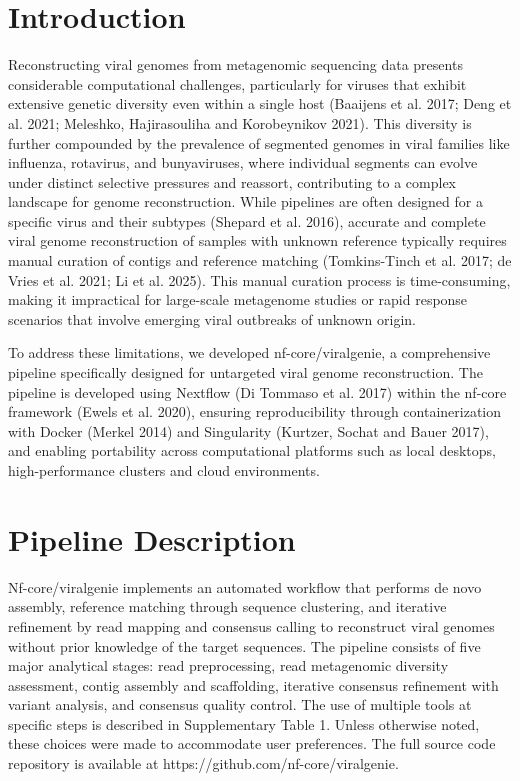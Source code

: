 
\section{Introduction}

Reconstructing viral genomes from metagenomic sequencing data presents considerable computational challenges, particularly for viruses that exhibit extensive genetic diversity even within a single host (Baaijens et al. 2017; Deng et al. 2021; Meleshko, Hajirasouliha and Korobeynikov 2021). This diversity is further compounded by the prevalence of segmented genomes in viral families like influenza, rotavirus, and bunyaviruses, where individual segments can evolve under distinct selective pressures and reassort, contributing to a complex landscape for genome reconstruction. While pipelines are often designed for a specific virus and their subtypes (Shepard et al. 2016), accurate and complete viral genome reconstruction of samples with unknown reference typically requires manual curation of contigs and reference matching (Tomkins-Tinch et al. 2017; de Vries et al. 2021; Li et al. 2025). This manual curation process is time-consuming, making it impractical for large-scale metagenome studies or rapid response scenarios that involve emerging viral outbreaks of unknown origin.

To address these limitations, we developed nf-core/viralgenie, a comprehensive pipeline specifically designed for untargeted viral genome reconstruction. The pipeline is developed using Nextflow (Di Tommaso et al. 2017) within the nf-core framework (Ewels et al. 2020), ensuring reproducibility through containerization with Docker (Merkel 2014) and Singularity (Kurtzer, Sochat and Bauer 2017), and enabling portability across computational platforms such as local desktops, high-performance clusters and cloud environments.

\section{Pipeline Description}

Nf-core/viralgenie implements an automated workflow that performs de novo assembly, reference matching through sequence clustering, and iterative refinement by read mapping and consensus calling to reconstruct viral genomes without prior knowledge of the target sequences. The pipeline consists of five major analytical stages: read preprocessing, read metagenomic diversity assessment, contig assembly and scaffolding, iterative consensus refinement with variant analysis, and consensus quality control. The use of multiple tools at specific steps is described in Supplementary Table 1. Unless otherwise noted, these choices were made to accommodate user preferences. The full source code repository is available at https://github.com/nf-core/viralgenie.

